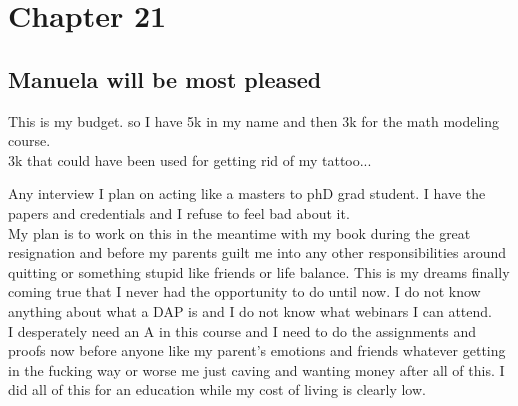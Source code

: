 \chapter{Chapter 21}
\section{Manuela will be most pleased}
This is my budget. so I have 5k in my name and then 3k for the math modeling course. \\ 

3k that could have been used for getting rid of my tattoo... 

Any interview I plan on acting like a masters to phD grad student. I have the papers and credentials and I refuse to feel bad about it. \\ 
My plan is to work on this in the meantime with my book during the great resignation and before my parents guilt me into any other responsibilities around quitting or something stupid like friends or life balance. This is my dreams finally coming true that 
I never had the opportunity to do until now. 
I do not know anything about what a DAP is and I do not know what webinars I can attend. \\
I desperately need an A in this course and I need to do the assignments and proofs now before anyone like my parent's emotions and friends whatever getting in the fucking way or worse me just caving and wanting money after all of this. I did all of this for an education while my cost of living is clearly low. 